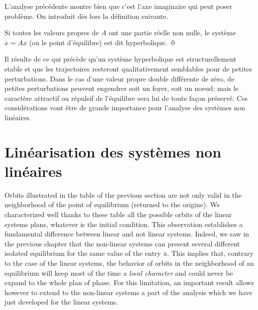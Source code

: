L'analyse pr{é}c{é}dente montre bien que c'est l'axe imaginaire qui peut
poser probl{è}me. On introduit d{è}s lors la d{é}finition suivante. 

\begin{definition} \label{hyperbolique} 
Si toutes
les valeurs propres de $A$ ont une partie r{é}elle non nulle,  le syst{è}me
$\dot x=A x$ (ou le point d'{é}quilibre)
 est dit hyperbolique. \qed 
\end{definition}

Il r{é}sulte de ce qui pr{é}c{è}de qu'un syst{è}me hyperbolique est
structurellement stable et que les trajectoires resteront qualitativement
semblables pour de petites perturbations. Dans le cas
d'une valeur propre double diff{é}rente de z{é}ro, de petites perturbations peuvent engendrer soit un foyer, soit un noeud; 
mais le caract{è}re attractif ou r{é}pulsif de l'{é}quilibre sera lui de toute fa\c{c}on 
pr{é}serv{é}.
Ces consid{é}rations vont {ê}tre
de grande importance pour l'analyse des syst{è}mes non lin{é}aires.
 

 \section{Linéarisation des systèmes non linéaires}

Orbits illustrated in the table of the previous section are not only valid in the neighborhood of the point of equilibrium (returned to the origine). We characterized well thanks to these table all the possible orbits of the linear systems plans, whatever is the initial condition. This observation establishes a fundamental difference between linear and not linear systems. Indeed, we saw in the previous chapter that the non-linear systems can present several different isolated equilibrium for the same value of the entry $\bar u$. This implies that, contrary to the case of the linear systems, the behavior of orbits in the neighborhood of an equilibrium will keep most of the time a \textit{local character} and could never be expand to the whole plan of phase.
For this limitation, an important result allows however to extend to the non-linear systems a part of the analysis which we have just developed for the linear systems.


